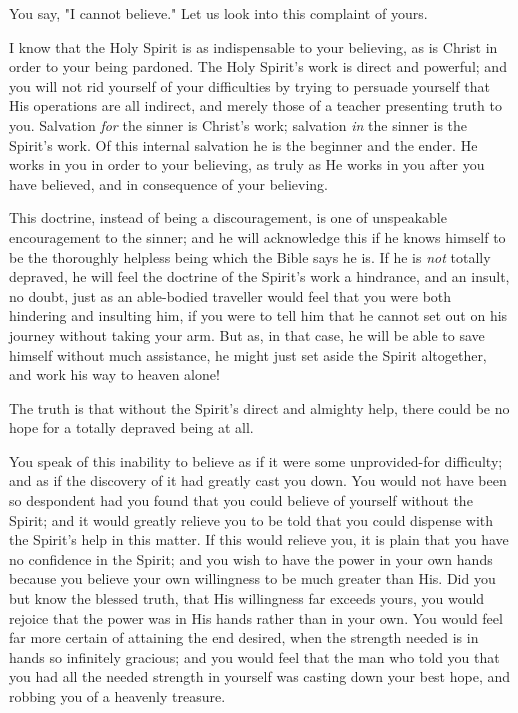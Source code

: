 \documentclass[
]{book}
\begin{document}
You say, "I cannot believe." Let us look into this complaint of yours.

I know that the Holy Spirit is as indispensable to your believing, as is Christ in order to your being pardoned. The Holy Spirit's work is direct and powerful; and you will not rid yourself of your difficulties by trying to persuade yourself that His operations are all indirect, and merely those of a teacher presenting truth to you. Salvation \emph{for} the sinner is Christ's work; salvation \emph{in} the sinner is the Spirit's work. Of this internal salvation he is the beginner and the ender. He works in you in order to your believing, as truly as He works in you after you have believed, and in consequence of your believing.

This doctrine, instead of being a discouragement, is one of unspeakable encouragement to the sinner; and he will acknowledge this if he knows himself to be the thoroughly helpless being which the Bible says he is. If he is \emph{not} totally depraved, he will feel the doctrine of the Spirit's work a hindrance, and an insult, no doubt, just as an able-bodied traveller would feel that you were both hindering and insulting him, if you were to tell him that he cannot set out on his journey without taking your arm. But as, in that case, he will be able to save himself without much assistance, he might just set aside the Spirit altogether, and work his way to heaven alone!

The truth is that without the Spirit's direct and almighty help, there could be no hope for a totally depraved being at all.

You speak of this inability to believe as if it were some unprovided-for difficulty; and as if the discovery of it had greatly cast you down. You would not have been so despondent had you found that you could believe of yourself without the Spirit; and it would greatly relieve you to be told that you could dispense with the Spirit's help in this matter. If this would relieve you, it is plain that you have no confidence in the Spirit; and you wish to have the power in your own hands because you believe your own willingness to be much greater than His. Did you but know the blessed truth, that His willingness far exceeds yours, you would rejoice that the power was in His hands rather than in your own. You would feel far more certain of attaining the end desired, when the strength needed is in hands so infinitely gracious; and you would feel that the man who told you that you had all the needed strength in yourself was casting down your best hope, and robbing you of a heavenly treasure.
\end{document}
